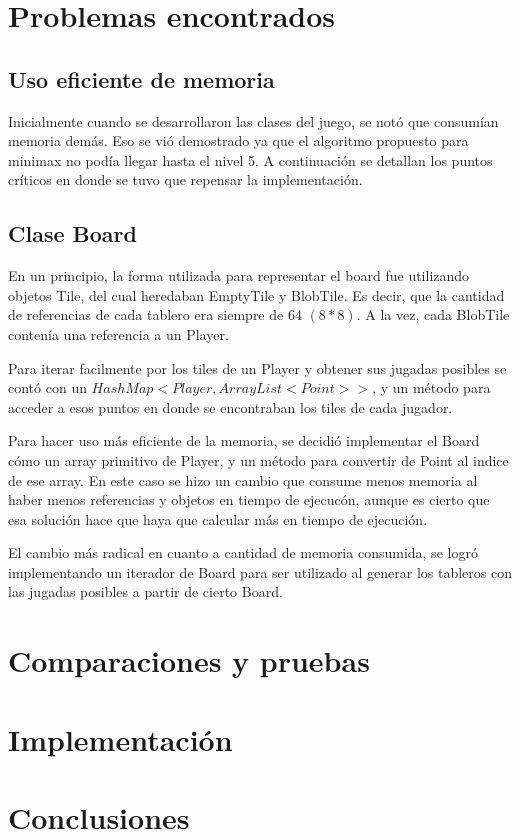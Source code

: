 \documentclass[10pt,a4paper,notitlepage,draft]{article}
\begin{document}
\section{Problemas encontrados}
\subsection{Uso eficiente de memoria}
  Inicialmente cuando se desarrollaron las clases del juego, se notó que consumían memoria demás.
  Eso se vió demostrado ya que el algoritmo propuesto para minimax no podía llegar hasta el nivel 5.
  A continuación se detallan los puntos críticos en donde se tuvo que repensar la implementación.

  \subsection{Clase Board}
    En un principio, la forma utilizada para representar el board fue utilizando objetos Tile, del cual heredaban EmptyTile y BlobTile.
    Es decir, que la cantidad de referencias de cada tablero era siempre de 64 $(8 * 8)$.  A la vez, cada BlobTile contenía una referencia a un Player.

    Para iterar facilmente por los tiles de un Player y obtener sus jugadas posibles se contó con un $HashMap<Player, ArrayList<Point>>$, y un método para acceder a esos  puntos en donde se encontraban los tiles de cada jugador.

    Para hacer uso más eficiente de la memoria, se decidió implementar el Board cómo un array primitivo de Player, y un método para convertir de Point al indice de ese array.
    En este caso se hizo un cambio que consume menos memoria al haber menos referencias y objetos en tiempo de ejecucón, aunque es cierto que esa solución hace que haya que calcular más en tiempo de ejecución.

    El cambio más radical en cuanto a cantidad de memoria consumida, se logró implementando un iterador de Board para ser utilizado al generar los tableros con
    las jugadas posibles a partir de cierto Board.

\section{Comparaciones y pruebas}
\section{Implementación}
\section{Conclusiones}
\end{document}
